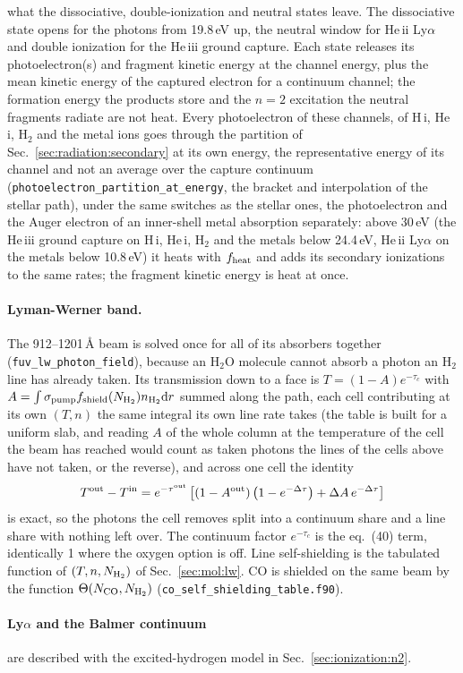 what the dissociative, double-ionization and neutral states leave. The
dissociative state opens for the photons from 19.8\,eV up, the neutral
window for He\,{\sc ii} Ly$\alpha$ and double ionization for the
He\,{\sc iii} ground capture. Each state releases its photoelectron(s)
and fragment kinetic energy at the channel energy, plus the mean kinetic
energy of the captured electron for a continuum channel; the formation
energy the products store and the $n=2$ excitation the neutral fragments
radiate are not heat. Every photoelectron of these channels, of H\,{\sc i},
He\,{\sc i}, H$_2$ and the metal ions goes through the partition of
Sec.~\ref{sec:radiation:secondary} at its own energy, the representative
energy of its channel and not an average over the capture continuum
(\texttt{photoelectron\_partition\_at\_energy}, the bracket and interpolation
of the stellar path), under the same switches as
the stellar ones, the photoelectron and the Auger electron of an inner-shell
metal absorption separately: above 30\,eV (the He\,{\sc iii} ground capture on
H\,{\sc i}, He\,{\sc i}, H$_2$ and the metals below 24.4\,eV, He\,{\sc ii}
Ly$\alpha$ on the metals below 10.8\,eV) it heats with $f_{\rm heat}$ and
adds its secondary ionizations to the same rates; the fragment kinetic
energy is heat at once.

\paragraph{Lyman-Werner band.} The 912--1201\,\AA{} beam is solved once for
all of its absorbers together (\texttt{fuv\_lw\_photon\_field}), because an
H$_2$O molecule cannot absorb a photon an H$_2$ line has already taken. Its
transmission down to a face is $T = (1-A)e^{-\tau_c}$ with
$A = \int \sigma_{\rm pump}f_{\rm shield}(N_{\rm H_2})n_{\rm H_2}{\rm d}r$
summed along the path, each cell contributing at its own $(T, n)$ the same
integral its own line rate takes (the table is built for a uniform slab, and
reading $A$ of the whole column at the temperature of the cell the beam has
reached would count as taken photons the lines of the cells above have not
taken, or the reverse),
and across one cell the identity
\begin{equation}
T^{\rm out}-T^{\rm in} = e^{-\tau^{\rm out}}
  \left[(1-A^{\rm out})\left(1-e^{-\Delta\tau}\right)
        + \Delta A\, e^{-\Delta\tau}\right]
\label{eq:rad:lwsplit}
\end{equation}
is exact, so the photons the cell removes split into a continuum share and a
line share with nothing left over. The continuum factor $e^{-\tau_c}$ is the
\citet{Draine1996} eq.~(40) term, identically 1 where the oxygen option is
off. Line self-shielding is the tabulated function of
$(T, n, N_{\rm H_2})$ of Sec.~\ref{sec:mol:lw}. CO is shielded on the same beam by
the \citet{Visser2009} function
$\Theta(N_{\rm CO},N_{\rm H_2})$ (\texttt{co\_self\_shielding\_table.f90}).

\paragraph{Ly$\alpha$ and the Balmer continuum} are described with the
excited-hydrogen model in Sec.~\ref{sec:ionization:n2}.

